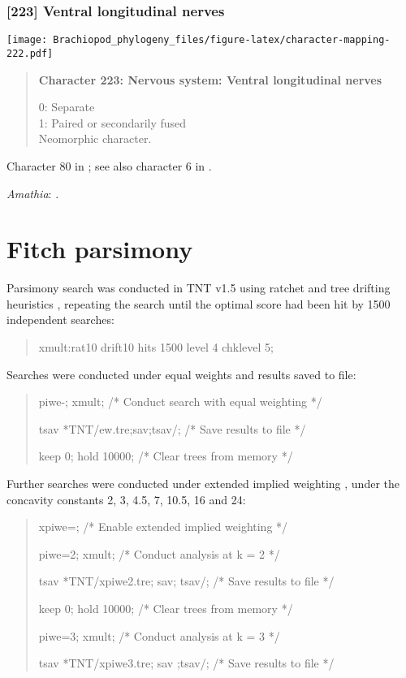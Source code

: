 \documentclass[openany]{book}
\theoremstyle{definition}
\theoremstyle{definition}
\theoremstyle{definition}
\theoremstyle{remark}
\begin{document}
\subsection*{{[}223{]} Ventral longitudinal
nerves}\label{ventral-longitudinal-nerves}

\texttt{[image: Brachiopod\_phylogeny\_files/figure-latex/character-mapping-222.pdf]}

\begin{quote}
\textbf{Character 223: Nervous system: Ventral longitudinal nerves}

0: Separate\\
1: Paired or secondarily fused\\
Neomorphic character.
\end{quote}

Character 80 in \citet{Glenner2004}; see also character 6 in
\citet{Vinther2008}.

\hypertarget{Amathia-coding-223}{}
\emph{Amathia}: \citet{Temereva2016Thenervous}.

\hypertarget{fitch}{\chapter{Fitch parsimony}\label{fitch}}

Parsimony search was conducted in TNT v1.5 \citep{Goloboff2016} using
ratchet and tree drifting heuristics \citep{Goloboff1999, Nixon1999},
repeating the search until the optimal score had been hit by 1500
independent searches:

\begin{quote}
xmult:rat10 drift10 hits 1500 level 4 chklevel 5;
\end{quote}

Searches were conducted under equal weights and results saved to file:

\begin{quote}
piwe-; xmult; {/* Conduct search with equal weighting */}

tsav *TNT/ew.tre;sav;tsav/; {/* Save results to file */}

keep 0; hold 10000; {/* Clear trees from memory */}
\end{quote}

Further searches were conducted under extended implied weighting
\citep{Goloboff1997, Goloboff2014}, under the concavity constants 2, 3,
4.5, 7, 10.5, 16 and 24:

\begin{quote}
xpiwe=; {/* Enable extended implied weighting */}

piwe=2; xmult; {/* Conduct analysis at k = 2 */}

tsav *TNT/xpiwe2.tre; sav; tsav/; {/* Save results to file */}

keep 0; hold 10000; {/* Clear trees from memory */}

piwe=3; xmult; {/* Conduct analysis at k = 3 */}

tsav *TNT/xpiwe3.tre; sav ;tsav/; {/* Save results to file */}
\end{quote}
\end{document}
